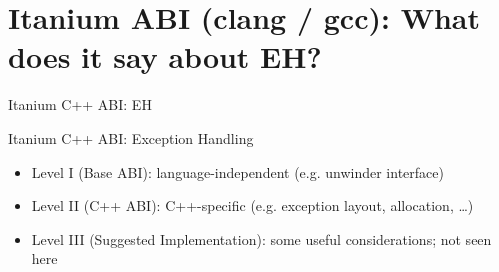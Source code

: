\section{Itanium ABI (clang / gcc): What does it say about EH?}
\begin{frame}{Itanium C++ ABI: EH}
  \begin{block}{Itanium C++ ABI: Exception Handling}
    \begin{itemize}
    \item Level I (Base ABI): language-independent (e.g. unwinder interface)
    \item Level II (C++ ABI): C++-specific (e.g. exception layout, allocation, \ldots{})
      \medskip

    \item Level III (Suggested Implementation): some useful considerations; not seen here
    \end{itemize}
  \end{block}
\end{frame}

